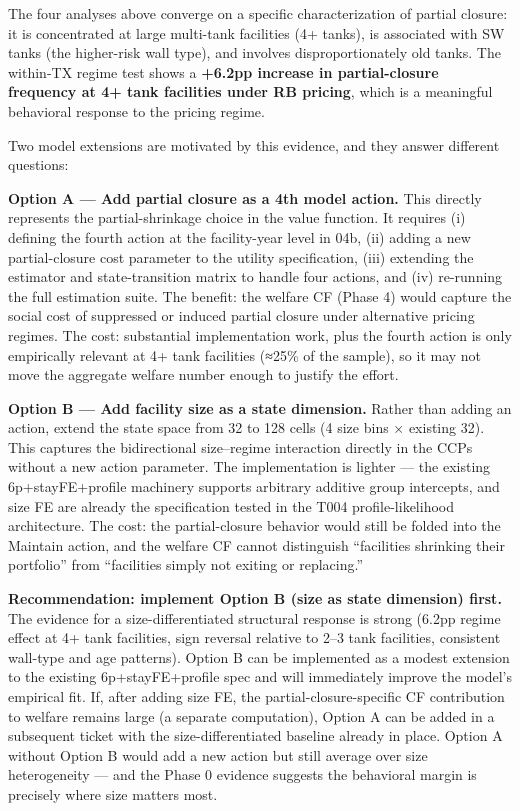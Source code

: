 \documentclass[
  11pt,
]{article}
\begin{document}
The four analyses above converge on a specific characterization of
partial closure: it is concentrated at large multi-tank facilities (4+
tanks), is associated with SW tanks (the higher-risk wall type), and
involves disproportionately old tanks. The within-TX regime test shows a
\textbf{+6.2pp increase in partial-closure frequency at 4+ tank
facilities under RB pricing}, which is a meaningful behavioral response
to the pricing regime.

Two model extensions are motivated by this evidence, and they answer
different questions:

\textbf{Option A --- Add partial closure as a 4th model action.} This
directly represents the partial-shrinkage choice in the value function.
It requires (i) defining the fourth action at the facility-year level in
04b, (ii) adding a new partial-closure cost parameter to the utility
specification, (iii) extending the estimator and state-transition matrix
to handle four actions, and (iv) re-running the full estimation suite.
The benefit: the welfare CF (Phase 4) would capture the social cost of
suppressed or induced partial closure under alternative pricing regimes.
The cost: substantial implementation work, plus the fourth action is
only empirically relevant at 4+ tank facilities (≈25\% of the sample),
so it may not move the aggregate welfare number enough to justify the
effort.

\textbf{Option B --- Add facility size as a state dimension.} Rather
than adding an action, extend the state space from 32 to 128 cells (4
size bins × existing 32). This captures the bidirectional size--regime
interaction directly in the CCPs without a new action parameter. The
implementation is lighter --- the existing 6p+stayFE+profile machinery
supports arbitrary additive group intercepts, and size FE are already
the specification tested in the T004 profile-likelihood architecture.
The cost: the partial-closure behavior would still be folded into the
Maintain action, and the welfare CF cannot distinguish ``facilities
shrinking their portfolio'' from ``facilities simply not exiting or
replacing.''

\textbf{Recommendation: implement Option B (size as state dimension)
first.} The evidence for a size-differentiated structural response is
strong (6.2pp regime effect at 4+ tank facilities, sign reversal
relative to 2--3 tank facilities, consistent wall-type and age
patterns). Option B can be implemented as a modest extension to the
existing 6p+stayFE+profile spec and will immediately improve the model's
empirical fit. If, after adding size FE, the partial-closure-specific CF
contribution to welfare remains large (a separate computation), Option A
can be added in a subsequent ticket with the size-differentiated
baseline already in place. Option A without Option B would add a new
action but still average over size heterogeneity --- and the Phase 0
evidence suggests the behavioral margin is precisely where size matters
most.
\end{document}
